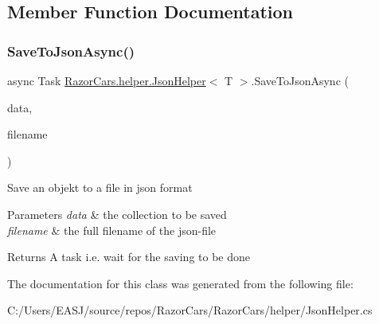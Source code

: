 \subsection{Member Function Documentation}
\mbox{\label{class_razor_cars_1_1helper_1_1_json_helper_a04e7a7779fbee18fae01fd9fca1133e7}} 
\subsubsection{\texorpdfstring{SaveToJsonAsync()}{SaveToJsonAsync()}}
{\footnotesize\ttfamily async Task \mbox{\hyperlink{class_razor_cars_1_1helper_1_1_json_helper}{Razor\+Cars.\+helper.\+Json\+Helper}}$<$ T $>$.Save\+To\+Json\+Async (\begin{DoxyParamCaption}\item[{I\+Collection$<$ T $>$}]{data,  }\item[{String}]{filename }\end{DoxyParamCaption})}



Save an objekt to a file in json format 


\begin{DoxyParams}{Parameters}
{\em data} & the collection to be saved\\
\hline
{\em filename} & the full filename of the json-\/file\\
\hline
\end{DoxyParams}
\begin{DoxyReturn}{Returns}
A task i.\+e. wait for the saving to be done
\end{DoxyReturn}


The documentation for this class was generated from the following file\+:\begin{DoxyCompactItemize}
\item 
C\+:/\+Users/\+E\+A\+S\+J/source/repos/\+Razor\+Cars/\+Razor\+Cars/helper/Json\+Helper.\+cs\end{DoxyCompactItemize}
